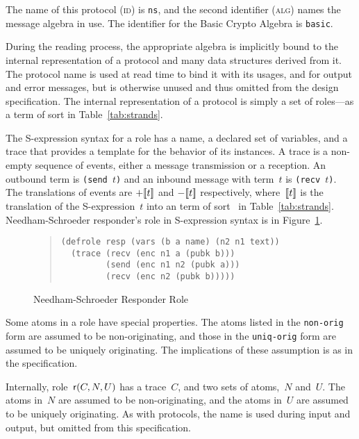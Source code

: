 \documentclass[12pt]{report}
\theoremstyle{definition}
\begin{document}
The name of this protocol (\textsc{id}) is \texttt{ns}, and the second
identifier (\textsc{alg}) names the message algebra in use.  The
identifier for the Basic Crypto Algebra is \texttt{basic}.

During the reading process, the appropriate algebra is implicitly
bound to the internal representation of a protocol and many data
structures derived from it.  The protocol name is used at read time to
bind it with its usages, and for output and error messages, but is
otherwise unused and thus omitted from the design specification. The
internal representation of a protocol is simply a set
of roles---as a term of sort  in Table~\ref{tab:strands}.

The S-expression syntax for a role has a name, a declared set of
variables, and a trace that provides a template for the behavior of
its instances.  A trace is a non-empty sequence of
events, either a message transmission or a reception.  An
outbound term is \texttt{(send $t$)} and an
inbound message with term~$t$ is \texttt{(recv $t$)}.
The translations of events are $\mathord +[\![t]\!]$ and
$\mathord -[\![t]\!]$ respectively, where~$[\![t]\!]$ is the
translation of the S-expression~$t$ into an term of sort~ in
Table~\ref{tab:strands}.  Needham-Schroeder responder's role in
S-expression syntax is in Figure~\ref{fig:ns responder}.

\begin{figure}
\begin{quote}
\begin{verbatim}
(defrole resp (vars (b a name) (n2 n1 text))
  (trace (recv (enc n1 a (pubk b)))
         (send (enc n1 n2 (pubk a)))
         (recv (enc n2 (pubk b)))))
\end{verbatim}
\end{quote}
\caption{Needham-Schroeder Responder Role}
\label{fig:ns responder}
\end{figure}

Some atoms in a role have special properties.  The atoms
listed in the \texttt{non-orig} form are assumed to be
non-originating, and those in the \texttt{uniq-orig} form are assumed
to be uniquely originating.  The implications of these assumption is
as in the specification.

Internally, role~$\operatorname{\mathsf{r}}(C,N,U)$ has a trace~$C$, and two
sets of atoms,~$N$ and~$U$.  The atoms in~$N$ are assumed to be
non-originating, and the atoms in~$U$ are assumed to be uniquely
originating.  As with protocols, the name is used during input and
output, but omitted from this specification.
\end{document}
